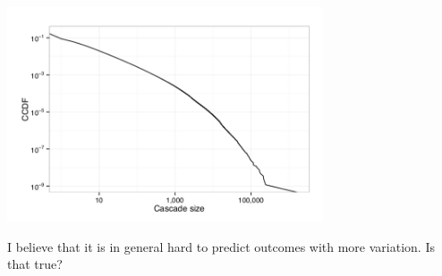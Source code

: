 \documentclass[aspectratio=169]{beamer}
\begin{document}
\begin{frame}

\begin{center}
\includegraphics[width=0.7\textwidth]{figures/martin_exploring_2016_fig2b}
\end{center}

\vfill
I believe that it is in general hard to predict outcomes with more variation.  Is that true?
\end{frame}
\end{document}
